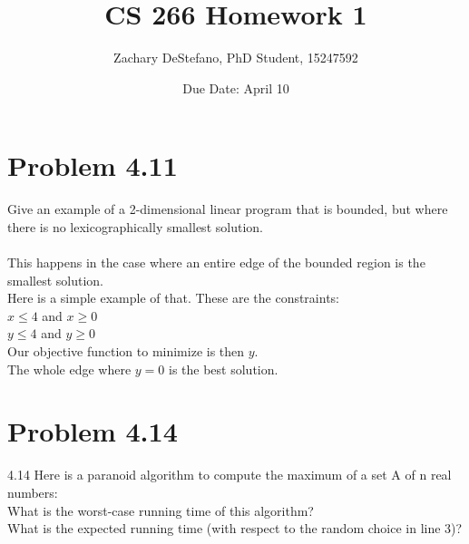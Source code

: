 \documentclass[11pt,psfig]{article}
\begin{document}
\setlength{\parskip}{1.2ex plus0.3ex minus 0.3ex}


\thispagestyle{empty} \pagestyle{myheadings} 



\title{CS 266 Homework 1}
\author{Zachary DeStefano, PhD Student, 15247592}
\date{Due Date: April 10}

\maketitle

\vfill\eject

\section*{Problem 4.11}

Give an example of a 2-dimensional linear program that is bounded, but
where there is no lexicographically smallest solution.\\
\\
This happens in the case where an entire edge of the bounded region is the smallest solution. \\
Here is a simple example of that. These are the constraints: \\
$x \leq 4$ and $x \geq 0$\\
$y \leq 4$ and $y \geq 0$\\
Our objective function to minimize is then $y$. \\
The whole edge where $y=0$ is the best solution. \\

\section*{Problem 4.14}

4.14 Here is a paranoid algorithm to compute the maximum of a set A of n real
numbers:\\
What is the worst-case running time of this algorithm? \\
What is the expected running time (with respect to the random choice in line 3)?\\

\end{document}

